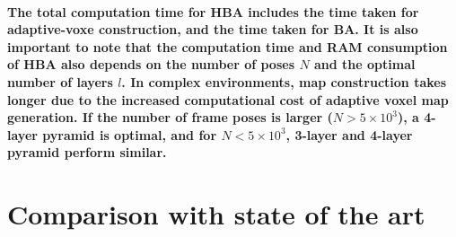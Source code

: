 \paragraph{\textnormal{The total computation time for HBA includes the time taken for adaptive-voxe construction, and the time taken for BA. It is also important to note that the computation time and RAM consumption of HBA also depends on the number of poses $N$ and the optimal number of layers $\mathit{l}$. In complex environments, map construction takes longer due to the increased computational cost of adaptive voxel map generation. If the number of frame poses is larger ($N > 5 \times 10^3$),  a 4-layer pyramid is optimal, and for $N < 5 \times 10^3$, 3-layer and 4-layer pyramid perform similar\cite{himstedt2014large}.
}}


\section{Comparison with state of the art}

